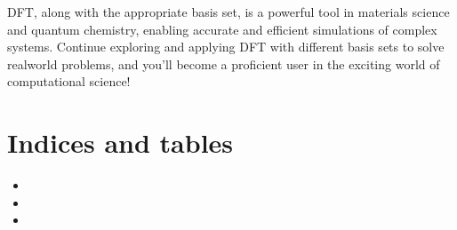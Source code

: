 \documentclass[letterpaper,10pt,english]{sphinxmanual}
\begin{document}
\sphinxAtStartPar
DFT, along with the appropriate basis set, is a powerful tool in materials science and quantum chemistry, enabling accurate and efficient simulations of complex systems. Continue exploring and applying DFT with different basis sets to solve real\sphinxhyphen{}world problems, and you’ll become a proficient user in the exciting world of computational science!


\chapter{Indices and tables}
\label{\detokenize{index:indices-and-tables}}\begin{itemize}
\item {} 
\sphinxAtStartPar
{}

\item {} 
\sphinxAtStartPar
{}

\item {} 
\sphinxAtStartPar
{}

\end{itemize}



\renewcommand{\indexname}{Index}
\printindex
\end{document}

